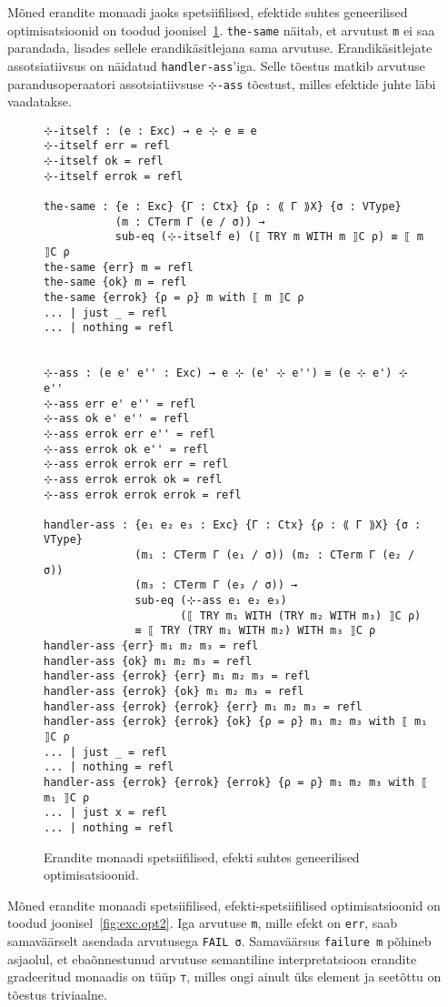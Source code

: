 \documentclass[a4paper,12pt]{article}
\begin{document}
Mõned erandite monaadi jaoks spetsiifilised, efektide suhtes geneerilised optimisatsioonid on toodud joonisel~\ref{fig:exc.opt1}.
{\tt the-same} näitab, et arvutust {\tt m} ei saa parandada, lisades sellele erandikäsitlejana sama arvutuse.
Erandikäsitlejate assotsiatiivsus on näidatud {\tt handler-ass}'iga.
Selle tõestus matkib arvutuse parandusoperaatori assotsiatiivsuse {\tt ⊹-ass} tõestust, milles efektide juhte läbi vaadatakse.

\begin{figure}
  \begin{BVerbatim}
⊹-itself : (e : Exc) → e ⊹ e ≡ e
⊹-itself err = refl
⊹-itself ok = refl
⊹-itself errok = refl

the-same : {e : Exc} {Γ : Ctx} {ρ : ⟪ Γ ⟫X} {σ : VType}
           (m : CTerm Γ (e / σ)) →
           sub-eq (⊹-itself e) (⟦ TRY m WITH m ⟧C ρ) ≡ ⟦ m ⟧C ρ
the-same {err} m = refl
the-same {ok} m = refl
the-same {errok} {ρ = ρ} m with ⟦ m ⟧C ρ
... | just _ = refl
... | nothing = refl


⊹-ass : (e e' e'' : Exc) → e ⊹ (e' ⊹ e'') ≡ (e ⊹ e') ⊹ e''
⊹-ass err e' e'' = refl
⊹-ass ok e' e'' = refl
⊹-ass errok err e'' = refl
⊹-ass errok ok e'' = refl
⊹-ass errok errok err = refl
⊹-ass errok errok ok = refl
⊹-ass errok errok errok = refl

handler-ass : {e₁ e₂ e₃ : Exc} {Γ : Ctx} {ρ : ⟪ Γ ⟫X} {σ : VType}
              (m₁ : CTerm Γ (e₁ / σ)) (m₂ : CTerm Γ (e₂ / σ))
              (m₃ : CTerm Γ (e₃ / σ)) →
              sub-eq (⊹-ass e₁ e₂ e₃)
                     (⟦ TRY m₁ WITH (TRY m₂ WITH m₃) ⟧C ρ)
              ≡ ⟦ TRY (TRY m₁ WITH m₂) WITH m₃ ⟧C ρ
handler-ass {err} m₁ m₂ m₃ = refl
handler-ass {ok} m₁ m₂ m₃ = refl
handler-ass {errok} {err} m₁ m₂ m₃ = refl
handler-ass {errok} {ok} m₁ m₂ m₃ = refl
handler-ass {errok} {errok} {err} m₁ m₂ m₃ = refl
handler-ass {errok} {errok} {ok} {ρ = ρ} m₁ m₂ m₃ with ⟦ m₁ ⟧C ρ
... | just _ = refl
... | nothing = refl
handler-ass {errok} {errok} {errok} {ρ = ρ} m₁ m₂ m₃ with ⟦ m₁ ⟧C ρ
... | just x = refl
... | nothing = refl
  \end{BVerbatim}
  \caption{Erandite monaadi spetsiifilised, efekti suhtes geneerilised optimisatsioonid.}
  \label{fig:exc.opt1}
\end{figure}

Mõned erandite monaadi spetsiifilised, efekti-spetsiifilised optimisatsioonid on toodud joonisel~\ref{fig:exc.opt2}.
Iga arvutuse {\tt m}, mille efekt on {\tt err}, saab samaväärselt asendada arvutusega {\tt FAIL σ}.
Samaväärsus {\tt failure m} põhineb asjaolul, et ebaõnnestunud arvutuse semantiline interpretatsioon erandite gradeeritud monaadis on tüüp {\tt ⊤}, milles ongi ainult üks element ja seetõttu on tõestus triviaalne.
\end{document}
